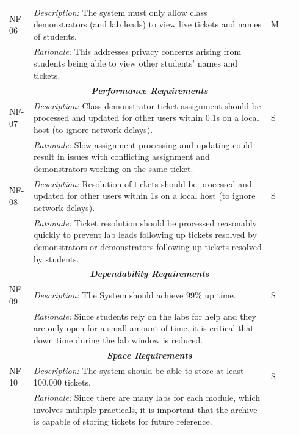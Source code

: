 \begin{table}[H]
\begin{tabular}{|p{0.07\linewidth} | p{0.78\linewidth} |p{0.09\linewidth}|}
      \hline\hline
 NF-06 & \textit{Description:} The system must only allow class demonstrators (and lab leads) to view live tickets and names of students. & M\\
  \cline{2-2}
  & \textit{Rationale:} This addresses privacy concerns arising from students being able to view other students' names and tickets. & \\
\hline
  
    \multicolumn{3}{c}{\textit{\textbf{Performance Requirements}}}\\
    
  \hline
   NF-07 & \textit{Description:} Class demonstrator ticket assignment should be processed and updated for other users within 0.1s on a local host (to ignore network delays). & S \\
  \cline{2-2}
  & \textit{Rationale:} Slow assignment processing and updating could result in issues with conflicting assignment and demonstrators working on the same ticket. & \\
 
   \hline\hline
   NF-08 & \textit{Description:} Resolution of tickets should be processed and updated for other users within 1s on a local host (to ignore network delays). & S \\
  \cline{2-2}
  & \textit{Rationale:} Ticket resolution should be processed reasonably quickly to prevent lab leads following up tickets resolved by demonstrators or demonstrators following up tickets resolved by students. & \\
  \hline
  
      \multicolumn{3}{c}{\textit{\textbf{Dependability Requirements}}}\\
  
   \hline
   NF-09 & \textit{Description:} The System should achieve 99\% up time. & S \\
  \cline{2-2}
  & \textit{Rationale:} Since students rely on the labs for help and they are only open for a small amount of time, it is critical that down time during the lab window is reduced. & \\
\hline
   
\multicolumn{3}{c}{\textit{\textbf{Space Requirements}}}\\
   
   \hline
   NF-10 & \textit{Description:} The system should be able to store at least 100,000 tickets. & S \\
    \cline{2-2}
  & \textit{Rationale:} Since there are many labs for each module, which involves multiple practicals, it is important that the archive is capable of storing tickets for future reference. & \\
 \hline

\end{tabular}
\end{table}


